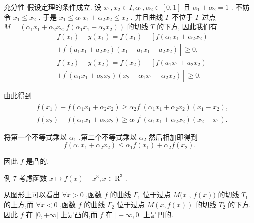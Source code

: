 充分性 假设定理的条件成立. 设 ${x}_{1},{x}_{2} \in  I,{\alpha }_{1},{\alpha }_{2} \in  \left\lbrack  {0,1}\right\rbrack$ 且 ${\alpha }_{1} + {\alpha }_{2} = 1$ . 不妨令 ${x}_{1} \leq  {x}_{2}$ . 于是 ${x}_{1} \leq  {\alpha }_{1}{x}_{1} + {\alpha }_{2}{x}_{2} \leq  {x}_{2}$ . 并且曲线 $\Gamma$ 不位于 $\Gamma$ 过点 $M = \left( {{\alpha }_{1}{x}_{1} + {\alpha }_{2}{x}_{2},f\left( {{\alpha }_{1}{x}_{1} + {\alpha }_{2}{x}_{2}}\right) }\right)$ 的切线 $T$ 的下方, 因此我们有
\begin{align*}
	&f\left( {x}_{1}\right)  - y\left( {x}_{1}\right)  = f\left( {x}_{1}\right)  - \left\lbrack  {f\left( {{\alpha }_{1}{x}_{1} + {\alpha }_{2}{x}_{2}}\right) }\right.\\
	&\left. {+{f}^{\prime }\left( {{a}_{1}{x}_{1} + {a}_{2}{x}_{2}}\right) \left( {{x}_{1} - {a}_{1}{x}_{1} - {a}_{2}{x}_{2}}\right) }\right\rbrack   \geq  0,\\
	&f\left( {x}_{2}\right)  - y\left( {x}_{2}\right)  = f\left( {x}_{2}\right)  - \left\lbrack  {f\left( {{a}_{1}{x}_{1} + {a}_{2}{x}_{2}}\right) }\right.\\
	&\left. {+{f}^{\prime }\left( {{\alpha }_{1}{x}_{1} + {\alpha }_{2}{x}_{2}}\right) \left( {{x}_{2} - {\alpha }_{1}{x}_{1} - {\alpha }_{2}{x}_{2}}\right) }\right\rbrack   \geq  0.
\end{align*}

由此得到
\begin{align*}
	&f\left( {x}_{1}\right)  - f\left( {{\alpha }_{1}{x}_{1} + {\alpha }_{2}{x}_{2}}\right)  \geq  {\alpha }_{2}{f}^{\prime }\left( {{\alpha }_{1}{x}_{1} + {\alpha }_{2}{x}_{2}}\right) \left( {{x}_{1} - {x}_{2}}\right) ,\\
	&f\left( {x}_{2}\right)  - f\left( {{\alpha }_{1}{x}_{1} + {\alpha }_{2}{x}_{2}}\right)  \geq  {\alpha }_{1}{f}^{\prime }\left( {{\alpha }_{1}{x}_{1} + {\alpha }_{2}{x}_{2}}\right) \left( {{x}_{2} - {x}_{1}}\right) .
\end{align*}

将第一个不等式乘以 ${\alpha }_{1}$ ,第二个不等式乘以 ${\alpha }_{2}$ 然后相加即得到
$$f\left( {{\alpha }_{1}{x}_{1} + {\alpha }_{2}{x}_{2}}\right)  \leq  {\alpha }_{1}f\left( {x}_{1}\right)  + {\alpha }_{2}f\left( {x}_{2}\right) .$$

因此 $f$ 是凸的.

例 7 考虑函数 $x \mapsto  f\left( x\right)  - {x}^{3},x \in  {\mathrm{R}}^{3}$ .

从图形上可以看出 $\forall x > 0$ ,函数 $f$ 的曲线 ${\Gamma }_{1}$ 位于过点 $M(x$ , $f\left( x\right) )$ 的切线 ${T}_{1}$ 的上方,而 $\forall x < 0$ ,函数 $f$ 的曲线 ${\Gamma }_{2}$ 位于过点 $M\left( {x,f\left( x\right) }\right)$ 的切线 ${T}_{2}$ 的下方. 因此 $f$ 在 $\rbrack 0, + \infty \lbrack$ 上是凸的,而 $f$ 在 $\rbrack  - \infty ,0\lbrack$ 上是凹的.

